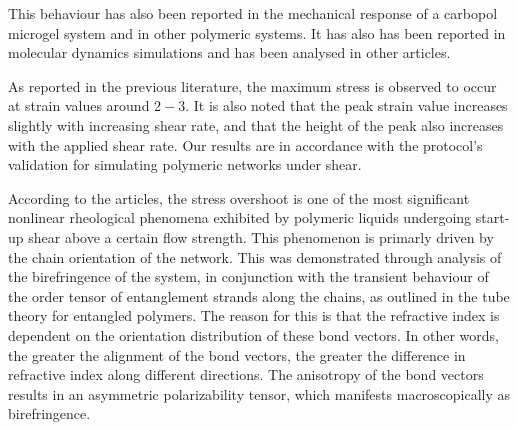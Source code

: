 This behaviour has also been reported in the mechanical response of a carbopol microgel system\citep{divouxStressOvershootSimple2011} and in other polymeric systems\citep{osakiStressOvershootPolymer2000a,ravindranathUniversalScalingCharacteristics2008,boukanyUniversalScalingBehavior2009}.
It has also has been reported in molecular dynamics simulations\citep{jeongEffectChainOrientation2017,caoSimulatingStartupShear2015,mohagheghiMolecularlyBasedCriteria2016,baigFlowEffectsMelt2010a} and has been analysed in other articles\citep{wangExploringStressOvershoot2009}.

As reported in the previous literature, the maximum stress is observed to occur at strain values around $2-3$.
It is also noted that the peak strain value increases slightly with increasing shear rate, and that the height of the peak also increases with the applied shear rate.
Our results are in accordance with the protocol's validation for simulating polymeric networks under shear.

According to the articles\citep{jeongEffectChainOrientation2017,janeschitz-krieglPolymerMeltRheology1983,pearsonFlowInducedBirefringenceConcentrated1989,masubuchiPrimitiveChainNetwork2020}, the stress overshoot is one of the most significant nonlinear rheological phenomena exhibited by polymeric liquids undergoing start-up shear above a certain flow strength.
This phenomenon is primarly driven by the chain orientation of the network.
This was demonstrated through analysis of the birefringence of the system, in conjunction with the transient behaviour of the order tensor of entanglement strands along the chains, as outlined in the tube theory for entangled polymers.
The reason for this is that the refractive index is dependent on the orientation distribution of these bond vectors. 
In other words, the greater the alignment of the bond vectors, the greater the difference in refractive index along different directions. 
The anisotropy of the bond vectors results in an asymmetric polarizability tensor, which manifests macroscopically as birefringence.

